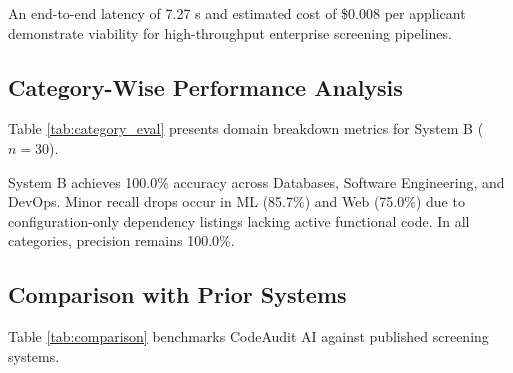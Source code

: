 \documentclass[conference]{IEEEtran}
\begin{document}
An end-to-end latency of 7.27 s and estimated cost of \$0.008 per applicant demonstrate viability for high-throughput enterprise screening pipelines.

\subsection{Category-Wise Performance Analysis}
Table \ref{tab:category_eval} presents domain breakdown metrics for System B ($n=30$).

\begin{table}[htbp]
\caption{Category-Wise Performance of System B ($n=30$)}
\label{tab:category_eval}
\centering
{}
\end{table}

System B achieves 100.0\% accuracy across Databases, Software Engineering, and DevOps. Minor recall drops occur in ML (85.7\%) and Web (75.0\%) due to configuration-only dependency listings lacking active functional code. In all categories, precision remains 100.0\%.

\subsection{Comparison with Prior Systems}
Table \ref{tab:comparison} benchmarks CodeAudit AI against published screening systems.
\end{document}
